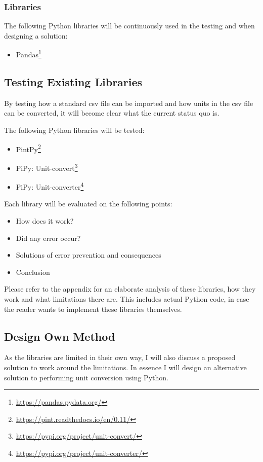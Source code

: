 \documentclass[sigchi, nonacm]{acmart}
\begin{document}
\subsubsection{Libraries}
The following Python libraries will be continuously used in the testing and when designing a solution:
\begin{itemize}
    \item{Pandas\footnote{\raggedright{\url{https://pandas.pydata.org/}}}}
\end{itemize}

\subsection{Testing Existing Libraries}
By testing how a standard csv file can be imported and how units in the csv file can be converted, it will become clear what the current status quo is. 

The following Python libraries will be tested:
\begin{itemize}
    \item{PintPy\footnote{\raggedright{\url{https://pint.readthedocs.io/en/0.11/}}}}
    \item{PiPy: Unit-convert\footnote{\raggedright{\url{https://pypi.org/project/unit-convert/}}}}
    \item{PiPy: Unit-converter\footnote{\raggedright{\url{https://pypi.org/project/unit-converter/}}}}
\end{itemize}

Each library will be evaluated on the following points:
\begin{itemize}
    \item How does it work?
    \item Did any error occur?
    \item Solutions of error prevention and consequences
    \item Conclusion
\end{itemize}

Please refer to the appendix for an elaborate analysis of these libraries, how they work and what limitations there are. This includes actual Python code, in case the reader wants to implement these libraries themselves.


\subsection{Design Own Method}
As the libraries are limited in their own way, I will also discuss a proposed solution to work around the limitations. In essence I will design an alternative solution to performing unit conversion using Python.
\end{document}
